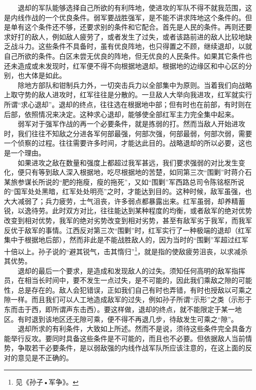 \documentclass[cn,11pt,chinese]{elegantbook}
\begin{document}
　　退却的军队能够选择自己所欲的有利阵地，使进攻的军队不得不就我范围，这是内线作战的一个优良条件。弱军要战胜强军，是不能不讲求阵地这个条件的。但是单有这个条件还不够，还要求别的条件和它配合。首先是人民的条件。再则还要求好打的敌人，例如敌人疲劳了，或者发生了过失，或者该路前进的敌人比较地缺乏战斗力。这些条件不具备时，虽有优良阵地，也只得置之不顾，继续退却，以就自己所欲的条件。白区未尝无优良的阵地，但无优良的人民条件。如果其它条件也还未造成或未发现时，红军便不得不向根据地退却。根据地的边缘区和中心区的分别，也大体是如此。\\
　　除地方部队和钳制兵力外，一切突击兵力以全部集中为原则。当着我们向战略上取守势的敌人进攻时，红军往往是分散的。一旦敌人大举向我进攻，红军就实行所谓“求心退却”。退却的终点，往往选在根据地中部；但有时也在前部，有时则在后部，依照情况来决定。这种求心退却，能够使全部红军主力完全集中起来。\\
　　弱军对于强军作战的再一个必要条件，就是拣弱的打。然而当敌人开始进攻时，我们往往不知敌之分进各军何部最强，何部次强，何部最弱，何部次弱，需要一个侦察的过程。往往需要许多时间，才能达此目的。战略退却的所以必要，这也是一个理由。\\
　　如果进攻之敌在数量和强度上都超过我军甚远，我们要求强弱的对比发生变化，便只有等到敌人深入根据地，吃尽根据地的苦楚，如同第三次“围剿”时蒋介石某旅参谋长所说的“肥的拖瘦，瘦的拖死”，又如“围剿”军西路总司令陈铭枢所说的“国军处处黑暗，红军处处明亮”之时，才能达到目的。这种时候，敌军虽强，也大大减弱了；兵力疲劳，士气沮丧，许多弱点都暴露出来。红军虽弱，却养精蓄锐，以逸待劳。此时双方对比，往往能达到某种程度的均衡，或者敌军的绝对优势改变到相对优势，我军的绝对劣势改变到相对劣势，甚至有敌军劣于我军，而我军反优于敌军的事情。江西反对第三次“围剿”时，红军实行了一种极端的退却（红军集中于根据地后部），然而非此是不能战胜敌人的，因为当时的“围剿”军超过红军十倍以上。孙子说的“避其锐气，击其惰归”\footnote[41]{ 见《孙子•军争》。}，就是指的使敌疲劳沮丧，以求减杀其优势。\\
　　退却的最后一个要求，是造成和发现敌人的过失。须知任何高明的敌军指挥员，在相当长时间中，要不发生一点过失，是不可能的，因此我们乘敌之隙的可能性，总是存在的。敌人会犯错误，正如我们自己有时也弄错，有时也授敌以可乘之隙一样。而且我们可以人工地造成敌军的过失，例如孙子所谓“示形”之类（示形于东而击于西，即所谓声东击西）。要这样做，退却的终点，就不能限定于某一地区。有时退到该地区还无隙可乘，便不得不再退几步，待敌发生可乘之“隙”。\\
　　退却所求的有利条件，大致如上所述。然而不是说，须待这些条件完全具备方能举行反攻。要同时具备这些条件是不可能的，而且也不必要。但依据敌人当前情势，争取若干必要条件，是以弱敌强的内线作战军队所应该注意的，在这上面的反对的意见是不正确的。\\
\end{document}
